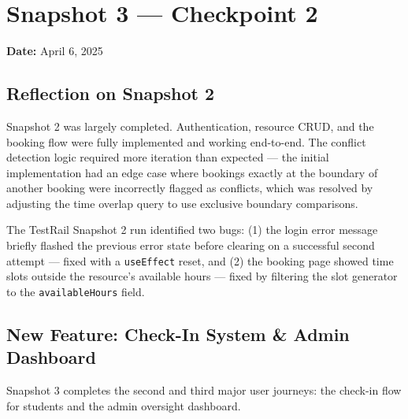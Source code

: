 \documentclass[12pt]{article}
\begin{document}
\section{Snapshot 3 --- Checkpoint 2}
\textbf{Date:} April 6, 2025

\subsection{Reflection on Snapshot 2}
Snapshot 2 was largely completed. Authentication, resource CRUD, and the booking flow were fully implemented and working end-to-end. The conflict detection logic required more iteration than expected --- the initial implementation had an edge case where bookings exactly at the boundary of another booking were incorrectly flagged as conflicts, which was resolved by adjusting the time overlap query to use exclusive boundary comparisons.

The TestRail Snapshot 2 run identified two bugs: (1) the login error message briefly flashed the previous error state before clearing on a successful second attempt --- fixed with a \texttt{useEffect} reset, and (2) the booking page showed time slots outside the resource's available hours --- fixed by filtering the slot generator to the \texttt{availableHours} field.

\subsection{New Feature: Check-In System \& Admin Dashboard}
Snapshot 3 completes the second and third major user journeys: the check-in flow for students and the admin oversight dashboard.
\end{document}
